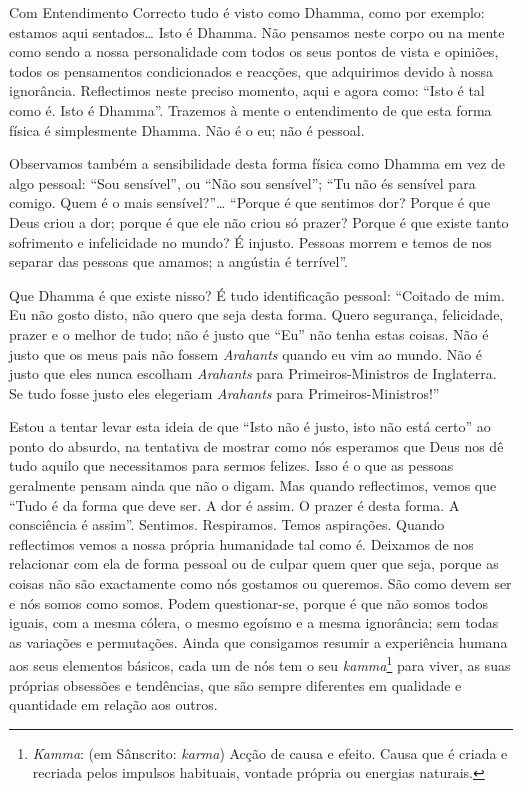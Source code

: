 Com Entendimento Correcto tudo é visto como Dhamma, como por exemplo: estamos
aqui sentados\ldots{} Isto é Dhamma. Não pensamos neste corpo ou na mente como
sendo a nossa personalidade com todos os seus pontos de vista e opiniões, todos
os pensamentos condicionados e reacções, que adquirimos devido à nossa
ignorância. Reflectimos neste preciso momento, aqui e agora como: “Isto é tal
como é. Isto é Dhamma”. Trazemos à mente o entendimento de que esta forma física
é simplesmente Dhamma. Não é o eu; não é pessoal.

Observamos também a sensibilidade desta forma física como Dhamma em vez de algo
pessoal: “Sou sensível”, ou “Não sou sensível”; “Tu não és sensível para comigo.
Quem é o mais sensível?”\ldots{} “Porque é que sentimos dor? Porque é que Deus
criou a dor; porque é que ele não criou só prazer? Porque é que existe tanto
sofrimento e infelicidade no mundo? É injusto. Pessoas morrem e temos de nos
separar das pessoas que amamos; a angústia é terrível”.

Que Dhamma é que existe nisso? É tudo identificação pessoal: “Coitado de mim. Eu
não gosto disto, não quero que seja desta forma. Quero segurança, felicidade,
prazer e o melhor de tudo; não é justo que “Eu” não tenha estas coisas. Não é
justo que os meus pais não fossem \emph{Arahants} quando eu vim ao mundo. Não é
justo que eles nunca escolham \emph{Arahants} para Primeiros-Ministros de
Inglaterra. Se tudo fosse justo eles elegeriam \emph{Arahants} para
Primeiros-Ministros!”

Estou a tentar levar esta ideia de que “Isto não é justo, isto não está certo”
ao ponto do absurdo, na tentativa de mostrar como nós esperamos que Deus nos dê
tudo aquilo que necessitamos para sermos felizes. Isso é o que as pessoas
geralmente pensam ainda que não o digam. Mas quando reflectimos, vemos que “Tudo
é da forma que deve ser. A dor é assim. O prazer é desta forma. A consciência é
assim”. Sentimos. Respiramos. Temos aspirações. Quando reflectimos vemos a nossa
própria humanidade tal como é. Deixamos de nos relacionar com ela de forma
pessoal ou de culpar quem quer que seja, porque as coisas não são exactamente
como nós gostamos ou queremos. São como devem ser e nós somos como somos. Podem
questionar-se, porque é que não somos todos iguais, com a mesma cólera, o mesmo
egoísmo e a mesma ignorância; sem todas as variações e permutações. Ainda que
consigamos resumir a experiência humana aos seus elementos básicos, cada um de
nós tem o seu \emph{kamma}\footnote{%
  \emph{Kamma}: (em Sânscrito: \emph{karma}) Acção de causa e efeito. Causa que
  é criada e recriada pelos impulsos habituais, vontade própria ou energias
  naturais.} para viver, as suas próprias obsessões e tendências, que são sempre
diferentes em qualidade e quantidade em relação aos outros.

